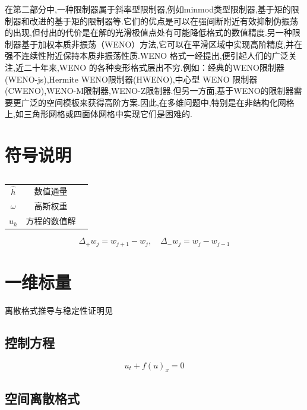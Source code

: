 \documentclass{book}
\begin{document}
在第二部分中,一种限制器属于斜率型限制器,例如minmod类型限制器\cite{RKDG2,RKDG3,RKDG4,RKDG5},基于矩的限制器\cite{基于矩的限制器}和改进的基于矩的限制器\cite{改进的基于矩的限制器}等.它们的优点是可以在强间断附近有效抑制伪振荡的出现,但付出的代价是在解的光滑极值点处有可能降低格式的数值精度.另一种限制器基于加权本质非振荡（WENO）方法\cite{WENO1,WENO2,WENO3,WENO4,WENO5},它可以在平滑区域中实现高阶精度,并在强不连续性附近保持本质非振荡性质.WENO 格式一经提出,便引起人们的广泛关注,近二十年来,WENO 的各种变形格式层出不穷.例如：经典的WENO限制器(WENO-js)\cite{WENO-js1,WENO-js2},Hermite WENO限制器(HWENO)\cite{HWENO1,HWENO2},中心型 WENO 限制器(CWENO)\cite{CWENO},WENO-M限制器\cite{WENO-M},WENO-Z限制器\cite{WENO-Z}.但另一方面,基于WENO的限制器需要更广泛的空间模板来获得高阶方案.因此,在多维问题中,特别是在非结构化网格上,如三角形网格或四面体网格中实现它们是困难的.

\section{符号说明}
\begin{table}[htbp]
    \centering
    \label{table:}
    \caption{}
    \begin{tabular}{ccc}
        \toprule
                  &              & \\
        \midrule
        $\hat{h}$ & 数值通量     & \\
        $\omega$  & 高斯权重     & \\
        $u_h$     & 方程的数值解 & \\
        \bottomrule
    \end{tabular}
\end{table}

\begin{equation}
    \Delta_{+} w_{j}=w_{j+1}-w_{j}, \quad \Delta_{-} w_{j}=w_{j}-w_{j-1}
\end{equation}

\section{一维标量}
离散格式推导与稳定性证明见\cite{RN16}
\subsection{控制方程}
\begin{equation}
    u_t+f(u)_x = 0
\end{equation}
\subsection{空间离散格式}
\end{document}

